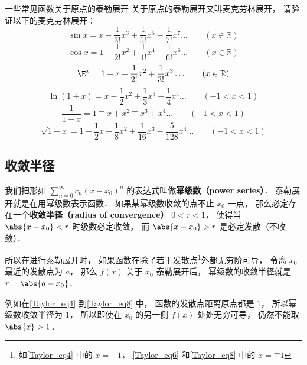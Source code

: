 \begin{exercise}{一些常见函数关于原点的泰勒展开}
关于原点的泰勒展开又叫麦克劳林展开， 请验证以下的麦克劳林展开：
\begin{equation}\label{Taylor_eq10}
\sin x = x - \frac{1}{3!} x^3 + \frac{1}{5!} x^5 - \frac{1}{7!} x^7 \ldots
\qquad (x \in \mathbb R)
\end{equation}
\begin{equation}
\cos x = 1 - \frac{1}{2!} x^2 + \frac{1}{4!} x^4 -\frac{1}{6!} x^6 \ldots
\qquad (x \in \mathbb R)
\end{equation}
\begin{equation}\label{Taylor_eq11}
\E^x =1 + x + \frac{1}{2!} x^2 + \frac{1}{3!} x^3  \ldots
\qquad (x \in \mathbb R)
\end{equation}
\begin{equation}\label{Taylor_eq4}
\ln (1+x) = x - \frac12 x^2 + \frac13 x^3 - \frac14 x^4 \ldots
\qquad (-1 < x < 1)
\end{equation}
\begin{equation}\label{Taylor_eq6}
\frac{1}{1 \pm x} = 1 \mp x + x^2 \mp x^3 + x^4 \ldots
\qquad (-1 < x < 1)
\end{equation}
\begin{equation}\label{Taylor_eq8}
\sqrt{1\pm x} = 1 \pm \frac12 x - \frac18 x^2 \pm \frac{1}{16} x^3 - \frac{5}{128}x^4 \ldots
\qquad (-1 < x < 1)
\end{equation}
\end{exercise}

\subsection{收敛半径}
我们把形如 $\sum_{n=0}^\infty c_n (x-x_0)^n$ 的表达式叫做\textbf{幂级数（power series）}． 泰勒展开就是在用幂级数表示函数． 如果某幂级数收敛的点不止 $x_0$ 一点， 那么必定存在一个\textbf{收敛半径（radius of convergence）} $0 < r < 1$， 使得当 $\abs{x-x_0} < r$ 时级数必定收敛， 而 $\abs{x-x_0} > r$ 是必定发散（不收敛）．

所以在进行泰勒展开时， 如果函数在除了若干发散点\footnote{如\autoref{Taylor_eq4} 中的 $x = -1$， \autoref{Taylor_eq6} 和\autoref{Taylor_eq8} 中的 $x = \mp 1$}外都无穷阶可导， 令离 $x_0$ 最近的发散点为 $a$， 那么 $f(x)$ 关于 $x_0$ 泰勒展开后， 幂级数的收敛半径就是 $r = \abs{a - x_0}$．

例如在\autoref{Taylor_eq4} 到\autoref{Taylor_eq8} 中， 函数的发散点距离原点都是 1， 所以幂级数收敛半径为 1， 所以即使在 $x_0$ 的另一侧 $f(x)$ 处处无穷可导， 仍然不能取 $\abs{x} > 1$．

